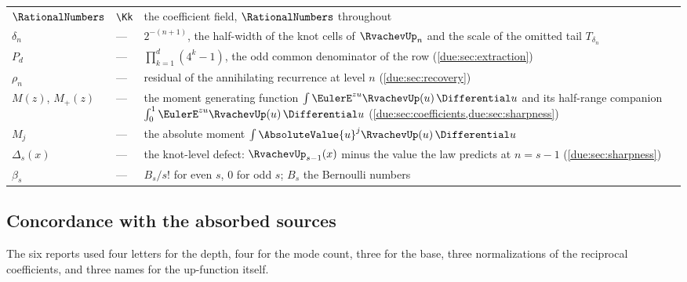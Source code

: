 \documentclass[11pt,oneside]{article}
\theoremstyle{plain}
\theoremstyle{definition}
\theoremstyle{remark}
\newcommand{\Kk}{\RationalNumbers}                          %
\newcommand{\upn}[1]{\RvachevUp_{#1}}
\begin{document}
\begin{longtable}{@{}l l p{}@{}}
\(\Kk\) & \verb|\Kk| & the coefficient field, \(\RationalNumbers\)
  throughout\\
\(\delta_{n}\) & --- & \(2^{-(n+1)}\), the half-width of the knot cells of
  \(\upn{n}\) and the scale of the omitted tail \(T_{\delta_n}\)\\
\(P_{d}\) & --- & \(\prod_{k=1}^{d}(4^{k}-1)\), the odd common denominator of the
  row (\cref{due:sec:extraction})\\
\(\rho_{n}\) & --- & residual of the annihilating recurrence at level \(n\)
  (\cref{due:sec:recovery})\\
\(M(z)\), \(M_{+}(z)\) & --- & the moment generating function
  \(\int\EulerE^{zu}\RvachevUp(u)\,\Differential u\) and its half-range
  companion \(\int_{0}^{1}\EulerE^{zu}\RvachevUp(u)\,\Differential u\)
  (\cref{due:sec:coefficients,due:sec:sharpness})\\
\(M_{j}\) & --- & the absolute moment \(\int\AbsoluteValue{u}^{j}\RvachevUp(u)\,\Differential u\)\\
\(\Delta_{s}(x)\) & --- & the knot-level defect: \(\upn{s-1}(x)\) minus the value the
  law predicts at \(n=s-1\) (\cref{due:sec:sharpness})\\
\(\beta_{s}\) & --- & \(B_{s}/s!\) for even \(s\), \(0\) for odd \(s\); \(B_{s}\) the
  Bernoulli numbers\\
\bottomrule
\end{longtable}

\subsection{Concordance with the absorbed sources}

The six reports used four letters for the depth, four for the mode count,
three for the base, three normalizations of the reciprocal coefficients, and
three names for the up-function itself.
\end{document}
